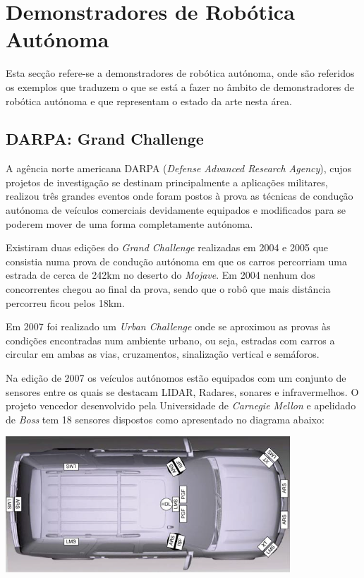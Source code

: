 \section{Demonstradores de Robótica Autónoma}
Esta secção refere-se a demonstradores de robótica autónoma, onde são referidos
os exemplos que traduzem o que se está a fazer no âmbito de demonstradores de
robótica autónoma e que representam o estado da arte nesta área.


\subsection{DARPA: Grand Challenge}
A agência norte americana DARPA (\emph{Defense Advanced Research Agency}), cujos projetos de investigação se destinam principalmente a aplicações militares, realizou três grandes eventos onde foram postos à prova as técnicas de condução autónoma de veículos comerciais devidamente equipados e modificados para se poderem mover de uma forma completamente autónoma.  

Existiram duas edições do \emph{Grand Challenge} realizadas em 2004 e 2005 que consistia numa prova de condução autónoma em que os carros percorriam uma estrada de cerca de 242km no deserto do \emph{Mojave}. Em 2004 nenhum dos concorrentes chegou ao final da prova, sendo que o robô que mais distância percorreu ficou pelos 18km.

Em 2007 foi realizado um \emph{Urban Challenge} onde se aproximou as provas às condições encontradas num ambiente urbano, ou seja, estradas com carros a circular em ambas as vias, cruzamentos, sinalização vertical  e semáforos.

Na edição de 2007 os veículos autónomos estão equipados com um conjunto de sensores entre os quais se destacam LIDAR, Radares, sonares e infravermelhos. O projeto vencedor desenvolvido pela Universidade de \emph{Carnegie Mellon} e apelidado de
 \emph{Boss} \cite{Urmson:2008:ADU:1395073.1395077} tem
18 sensores dispostos como apresentado no diagrama abaixo:

\begin{center}
	\includegraphics[width=0.80\textwidth]{./figures/boss_sensors.png}
	\label{fig:2}
\end{center}

